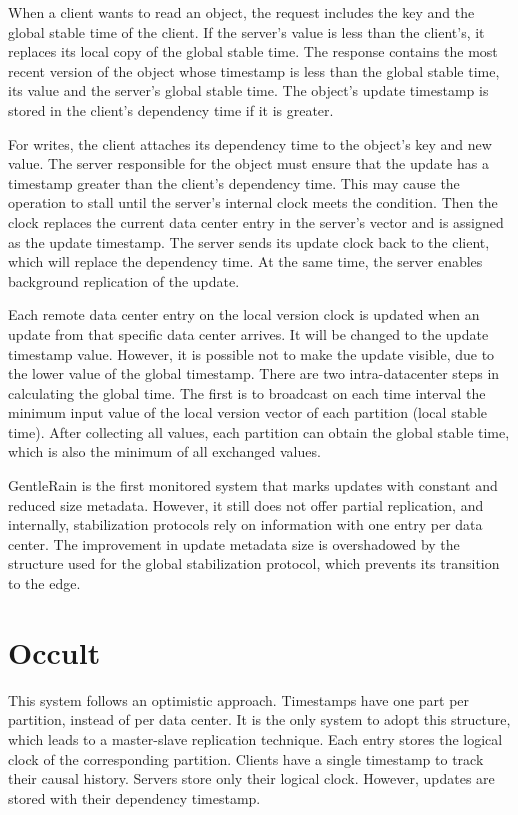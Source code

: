 When a client wants to read an object, the request includes the key and the global stable time of the client. If the server's value is less than the client's, it replaces its local copy of the global stable time. The response contains the most recent version of the object whose timestamp is less than the global stable time, its value and the server's global stable time. The object's update timestamp is stored in the client's dependency time if it is greater. 

For writes, the client attaches its dependency time to the object's key and new value. The server responsible for the object must ensure that the update has a timestamp greater than the client's dependency time. This may cause the operation to stall until the server's internal clock meets the condition. Then the clock replaces the current data center entry in the server's vector and is assigned as the update timestamp. The server sends its update clock back to the client, which will replace the dependency time. At the same time, the server enables background replication of the update. 

Each remote data center entry on the local version clock is updated when an update from that specific data center arrives. It will be changed to the update timestamp value. However, it is possible not to make the update visible, due to the lower value of the global timestamp. There are two intra-datacenter steps in calculating the global time. The first is to broadcast on each time interval the minimum input value of the local version vector of each partition (local stable time). After collecting all values, each partition can obtain the global stable time, which is also the minimum of all exchanged values. 

GentleRain is the first monitored system that marks updates with constant and reduced size metadata. However, it still does not offer partial replication, and internally, stabilization protocols rely on information with one entry per data center. The improvement in update metadata size is overshadowed by the structure used for the global stabilization protocol, which prevents its transition to the edge.

\section{Occult}
\label{sec:soa:occult}

This system \cite{mehdi2017can} follows an optimistic approach. Timestamps have one part per partition, instead of per data center. It is the only system to adopt this structure, which leads to a master-slave replication technique. Each entry stores the logical clock of the corresponding partition. Clients have a single timestamp to track their causal history. Servers store only their logical clock. However, updates are stored with their dependency timestamp. 

